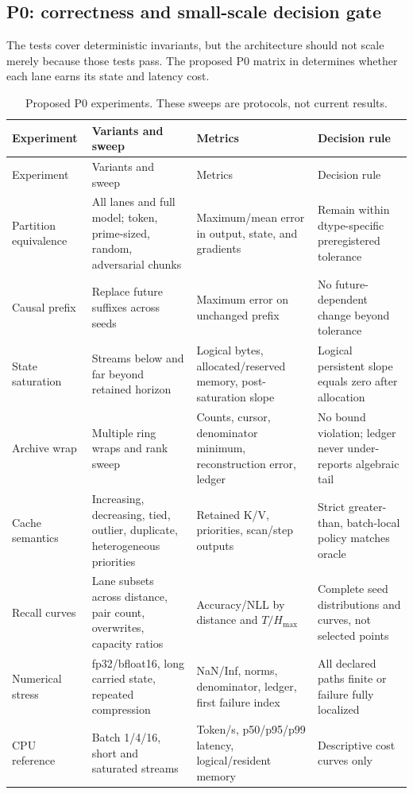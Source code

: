 \subsection{P0: correctness and small-scale decision gate}

The tests cover deterministic invariants, but the architecture should not
scale merely because those tests pass. The proposed P0 matrix in
 determines whether each lane earns its state and latency cost.

\begin{longtable}{@{}p{}p{}
  p{}p{}@{}}
\caption{Proposed P0 experiments. These sweeps are protocols, not current
results.}
\label{tab:p0}\\
\toprule
Experiment & Variants and sweep & Metrics & Decision rule \\
\midrule
\endfirsthead
\toprule
Experiment & Variants and sweep & Metrics & Decision rule \\
\midrule
\endhead
Partition equivalence &
All lanes and full model; token, prime-sized, random, adversarial chunks &
Maximum/mean error in output, state, and gradients &
Remain within dtype-specific preregistered tolerance \\
Causal prefix &
Replace future suffixes across seeds &
Maximum error on unchanged prefix &
No future-dependent change beyond tolerance \\
State saturation &
Streams below and far beyond retained horizon &
Logical bytes, allocated/reserved memory, post-saturation slope &
Logical persistent slope equals zero after allocation \\
Archive wrap &
Multiple ring wraps and rank sweep &
Counts, cursor, denominator minimum, reconstruction error, ledger &
No bound violation; ledger never under-reports algebraic tail \\
Cache semantics &
Increasing, decreasing, tied, outlier, duplicate, heterogeneous priorities &
Retained K/V, priorities, scan/step outputs &
Strict greater-than, batch-local policy matches oracle \\
Recall curves &
Lane subsets across distance, pair count, overwrites, capacity ratios &
Accuracy/NLL by distance and \(T/H_{\max}\) &
Complete seed distributions and curves, not selected points \\
Numerical stress &
fp32/bfloat16, long carried state, repeated compression &
NaN/Inf, norms, denominator, ledger, first failure index &
All declared paths finite or failure fully localized \\
CPU reference &
Batch 1/4/16, short and saturated streams &
Token/s, p50/p95/p99 latency, logical/resident memory &
Descriptive cost curves only \\
\bottomrule
\end{longtable}

